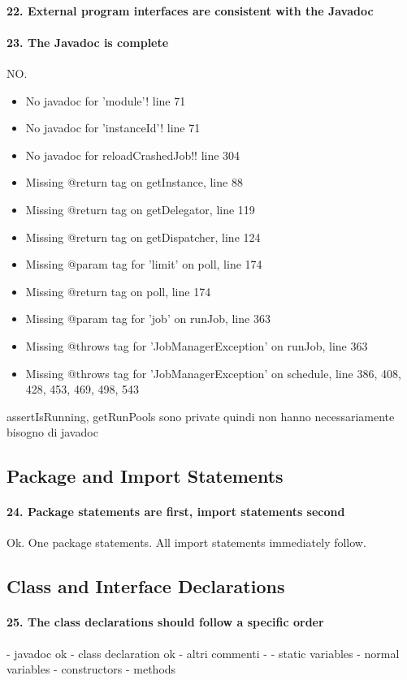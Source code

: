 \documentclass[english]{article}
\begin{document}
\paragraph{22. External program interfaces are consistent with the Javadoc}


\paragraph{23. The Javadoc is complete}
NO.
\begin{itemize}
	\item No javadoc for 'module'! line 71
	\item No javadoc for 'instanceId'! line 71
	\item No javadoc for reloadCrashedJob!! line 304
	\item Missing @return tag on getInstance, line 88
	\item Missing @return tag on getDelegator, line 119
	\item Missing @return tag on getDispatcher, line 124
	\item Missing @param tag for 'limit' on poll, line 174
	\item Missing @return tag on poll, line 174
	\item Missing @param tag for 'job' on runJob, line 363
	\item Missing @throws tag for 'JobManagerException' on runJob, line 363
	\item Missing @throws tag for 'JobManagerException' on schedule, line 386, 408, 428, 453, 469, 498, 543
\end{itemize}

assertIsRunning, getRunPools sono private quindi non hanno necessariamente bisogno di javadoc

\subsection{Package and Import Statements}
\paragraph{24. Package statements are first, import statements second}
Ok.
One package statements.
All import statements immediately follow.

\subsection{Class and Interface Declarations}
\paragraph{25. The class declarations should follow a specific order}
- javadoc ok
- class declaration ok
- altri commenti -
- static variables 
- normal variables
- constructors
- methods
\end{document}

